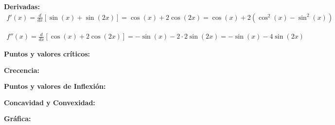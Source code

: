 \documentclass[12pt]{article}
\begin{document}
\begin{enumerate}[\hspace{9px} a)]
    \textbf{Derivadas: }
        \begin{align*}
            f'(x) = \frac{d}{dx}[\sin(x)+\sin(2x)] = \cos(x) + 2\cos(2x) = \cos(x) + 2(\cos^2(x)-\sin^2(x)) 
        \end{align*}

        \begin{align*}
            f''(x) = \frac{d}{dx}[\cos(x) + 2\cos(2x)] = -\sin(x) - 2\cdot2\sin(2x) = -\sin(x) - 4\sin(2x)
        \end{align*}

    \textbf{Puntos y valores cr\'iticos: }

    \textbf{Crecencia: }

    \textbf{Puntos y valores de Inflexi\'on: }

    \textbf{Concavidad y Convexidad: }

    \textbf{Gr\'afica: }

\end{enumerate}
\end{document}
